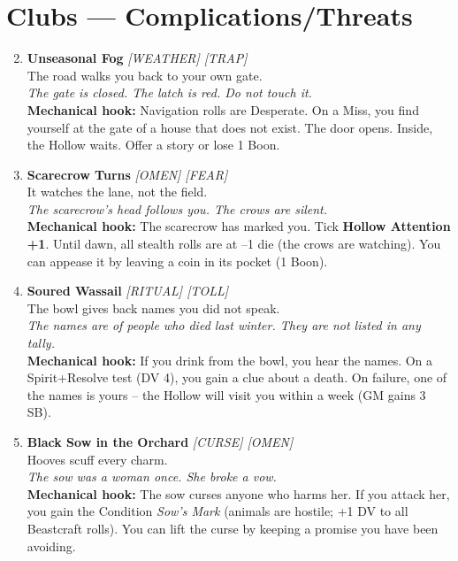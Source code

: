 \section*{Clubs --- Complications/Threats}
\label{sec:aelaerem-complications}
\begin{enumerate}
\setcounter{enumi}{1}
\item \textbf{Unseasonal Fog} \hfill \textit{[WEATHER] [TRAP]} \\
  The road walks you back to your own gate. \\
  \textit{The gate is closed. The latch is red. Do not touch it.} \\
  \textbf{Mechanical hook:} Navigation rolls are Desperate. On a Miss, you find yourself at the gate of a house that does not exist. The door opens. Inside, the Hollow waits. Offer a story or lose 1 Boon.

\item \textbf{Scarecrow Turns} \hfill \textit{[OMEN] [FEAR]} \\
  It watches the lane, not the field. \\
  \textit{The scarecrow's head follows you. The crows are silent.} \\
  \textbf{Mechanical hook:} The scarecrow has marked you. Tick \textbf{Hollow Attention +1}. Until dawn, all stealth rolls are at --1 die (the crows are watching). You can appease it by leaving a coin in its pocket (1 Boon).

\item \textbf{Soured Wassail} \hfill \textit{[RITUAL] [TOLL]} \\
  The bowl gives back names you did not speak. \\
  \textit{The names are of people who died last winter. They are not listed in any tally.} \\
  \textbf{Mechanical hook:} If you drink from the bowl, you hear the names. On a Spirit+Resolve test (DV 4), you gain a clue about a death. On failure, one of the names is yours -- the Hollow will visit you within a week (GM gains 3 SB).

\item \textbf{Black Sow in the Orchard} \hfill \textit{[CURSE] [OMEN]} \\
  Hooves scuff every charm. \\
  \textit{The sow was a woman once. She broke a vow.} \\
  \textbf{Mechanical hook:} The sow curses anyone who harms her. If you attack her, you gain the Condition \textit{Sow's Mark} (animals are hostile; +1 DV to all Beastcraft rolls). You can lift the curse by keeping a promise you have been avoiding.


\end{enumerate}

